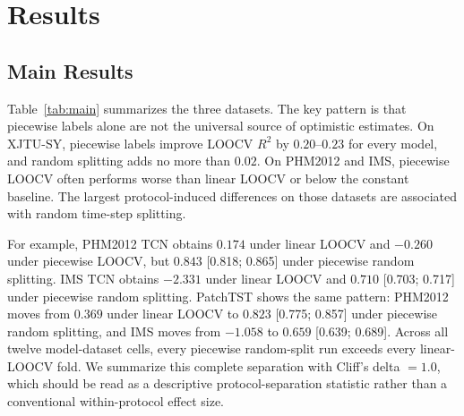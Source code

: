 \documentclass[pdflatex,sn-mathphys-num]{sn-jnl}
\begin{document}
\section{Results}
\subsection{Main Results}
Table~\ref{tab:main} summarizes the three datasets. The key pattern is that piecewise labels alone are not the universal source of optimistic estimates. On XJTU-SY, piecewise labels improve LOOCV $R^2$ by $0.20$--$0.23$ for every model, and random splitting adds no more than $0.02$. On PHM2012 and IMS, piecewise LOOCV often performs worse than linear LOOCV or below the constant baseline. The largest protocol-induced differences on those datasets are associated with random time-step splitting.

For example, PHM2012 TCN obtains $0.174$ under linear LOOCV and $-0.260$ under piecewise LOOCV, but $0.843$ [0.818; 0.865] under piecewise random splitting. IMS TCN obtains $-2.331$ under linear LOOCV and $0.710$ [0.703; 0.717] under piecewise random splitting. PatchTST shows the same pattern: PHM2012 moves from $0.369$ under linear LOOCV to $0.823$ [0.775; 0.857] under piecewise random splitting, and IMS moves from $-1.058$ to $0.659$ [0.639; 0.689]. Across all twelve model-dataset cells, every piecewise random-split run exceeds every linear-LOOCV fold. We summarize this complete separation with Cliff's delta $=1.0$, which should be read as a descriptive protocol-separation statistic rather than a conventional within-protocol effect size.
\end{document}
